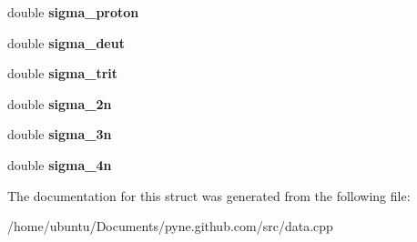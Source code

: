 \begin{DoxyCompactItemize}
\item 
double {\bfseries sigma\+\_\+proton}\hypertarget{structsimple__xs_aff5767a5644512bc20acdb7b6be11f6a}{}\label{structsimple__xs_aff5767a5644512bc20acdb7b6be11f6a}

\item 
double {\bfseries sigma\+\_\+deut}\hypertarget{structsimple__xs_a144a201fa75999fe72b1e7ff6cf599de}{}\label{structsimple__xs_a144a201fa75999fe72b1e7ff6cf599de}

\item 
double {\bfseries sigma\+\_\+trit}\hypertarget{structsimple__xs_ac94cd1b3c4d07c830484563268c9e3b4}{}\label{structsimple__xs_ac94cd1b3c4d07c830484563268c9e3b4}

\item 
double {\bfseries sigma\+\_\+2n}\hypertarget{structsimple__xs_a48428459c08bd8e7ca73ede3d5d1b12d}{}\label{structsimple__xs_a48428459c08bd8e7ca73ede3d5d1b12d}

\item 
double {\bfseries sigma\+\_\+3n}\hypertarget{structsimple__xs_a2d20b02fe8098c55466d12de065bfdee}{}\label{structsimple__xs_a2d20b02fe8098c55466d12de065bfdee}

\item 
double {\bfseries sigma\+\_\+4n}\hypertarget{structsimple__xs_a1c2a32a82a8f3e381d67b778c89c499e}{}\label{structsimple__xs_a1c2a32a82a8f3e381d67b778c89c499e}

\end{DoxyCompactItemize}


The documentation for this struct was generated from the following file\+:\begin{DoxyCompactItemize}
\item 
/home/ubuntu/\+Documents/pyne.\+github.\+com/src/data.\+cpp\end{DoxyCompactItemize}
